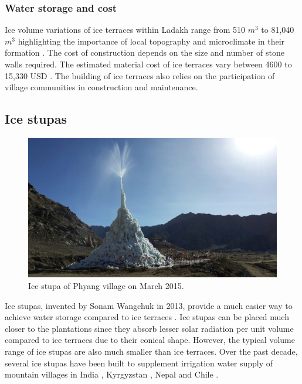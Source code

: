 \subsubsection{Water storage and cost}

Ice volume variations of ice terraces within Ladakh  range from 510 $m^3$ to 81,040 $m^3$ highlighting
the importance of local topography and microclimate in their formation
\citep{nusserSociohydrologyArtificialGlaciers2019, norphelSnowWaterHarvesting2015}. The cost of construction
depends on the size and number of stone walls required. The estimated material cost of ice terraces vary between
4600 to 15,330 USD \citep{nusserSociohydrologyArtificialGlaciers2019}. The building of ice terraces also relies
on the participation of village communities in construction and maintenance. 


\subsection{Ice stupas}

\begin{figure}[htb]
\centering
\includegraphics[width=\textwidth]{figs/IS_example.jpg}
\caption{Ice stupa of Phyang village on March 2015.}
\label{fig:ISexample}
\end{figure}

Ice stupas, invented by Sonam Wangchuk in 2013, provide a much easier way to achieve water storage compared to
ice terraces \citep{wangchukIceStupaArtificial2014}. Ice stupas can be placed much closer to the plantations
since they absorb lesser solar radiation per unit volume compared to ice terraces due to their conical shape.
However, the typical volume range of ice stupas are also much smaller than ice
terraces\citep{nusserSociohydrologyArtificialGlaciers2019}. Over the past decade, several ice stupas have been
built to supplement irrigation water supply of mountain villages in India
\citep{wangchukIceStupaCompetition2020, palmerStoringFrozenWater2022, aggarwalAdaptationClimateChange2021},
Kyrgyzstan \citep{bbcnewsBrightArtificialGlacier2020}, Nepal and Chile
\citep{reutersConservationistsChileAim2021}.


